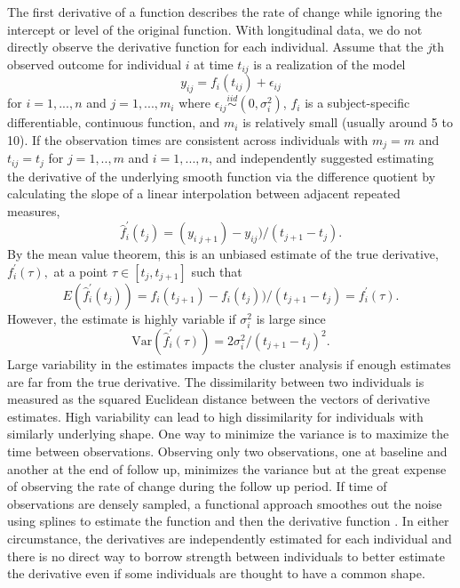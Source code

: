 \documentclass[12pt]{article}
\begin{document}
The first derivative of a function describes the rate of change while ignoring the intercept or level of the original function. With longitudinal data, we do not directly observe the derivative function for each individual. Assume that the $j$th observed outcome for individual $i$ at time $t_{ij}$ is a realization of the model
$$y_{ij}= f_i(t_{ij})+\epsilon_{ij}$$
for $i=1,...,n$ and $j=1,...,m_{i}$ where $\epsilon_{ij}\overset{iid}{\sim} (0,\sigma_{i}^{2})$, $f_{i}$ is a subject-specific differentiable, continuous function, and $m_{i}$ is relatively small (usually around 5 to 10). If the observation times are consistent across individuals with $m_{j}=m$ and $t_{ij} = t_{j}$ for $j=1,..,m$ and $i=1,...,n$, \Textcite{moller2003} and \textcite{d2000} independently suggested estimating the derivative of the underlying smooth function via the difference quotient by calculating the slope of a linear interpolation between adjacent repeated measures,
$$\hat{f}_{i}^{'}(t_{j}) = (y_{i\;j+1})-y_{ij})/(t_{j+1}-t_j).$$
By the mean value theorem, this is an unbiased estimate of the true derivative, $f_{i}^{'}(\tau),$ at a point $\tau\in[t_{j},t_{j+1}]$ such that
$$E(\hat{f}_{i}^{'}(t_{j})) = f_i(t_{j+1})-f_i(t_j))/(t_{j+1}-t_j) =f_{i}^{'}(\tau). $$
However, the estimate is highly variable if $\sigma_{i}^{2}$ is large since
$$\text{Var}(\hat{f}_{i}^{'}(\tau)) =  2\sigma^{2}_{i}/ (t_{j+1}-t_j)^{2}.$$
Large variability in the estimates impacts the cluster analysis if enough estimates are far from the true derivative. The dissimilarity between two individuals is measured as the squared Euclidean distance between the vectors of derivative estimates. High variability can lead to high dissimilarity for individuals with similarly underlying shape. One way to minimize the variance is to maximize the time between observations. Observing only two observations, one at baseline and another at the end of follow up, minimizes the variance but at the great expense of observing the rate of change during the follow up period. If time of observations are densely sampled, a functional approach smoothes out the noise using splines to estimate the function and then the derivative function \cite{tarpey2003}. In either circumstance, the derivatives are independently estimated for each individual and there is no direct way to borrow strength between individuals to better estimate the derivative even if some individuals are thought to have a common shape.
\end{document}
